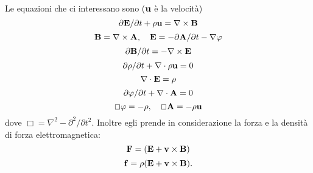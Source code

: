 Le equazioni che ci interessano sono ($\mathbf{u}$ \`e la velocit\`a)
\begin{equation}
  \partial \mathbf{E} / \partial t + \rho \mathbf{u} = \nabla \times \mathbf{B}
  \label{eq:corrente}
\end{equation}
\begin{equation}
  \mathbf{B} = \nabla \times \mathbf{A}, \quad \mathbf{E} = 
  - \partial \mathbf{A} / \partial t - \nabla \varphi
  \label{eq:aephi}
\end{equation}
\begin{equation}
  \partial \mathbf{B} / \partial t = - \nabla \times \mathbf{E}
  \label{eq:bede}
\end{equation}
\begin{equation}
  \partial \rho / \partial t + \nabla \cdot \rho \mathbf{u} = 0
  \label{eq:rhoeu}
\end{equation}
\begin{equation}
  \nabla \cdot \mathbf{E} = \rho
  \label{eq:rhoede}
\end{equation}
\begin{equation}
  \partial \varphi / \partial t + \nabla \cdot \mathbf{A} = 0
  \label{eq:phiea}
\end{equation}
\begin{equation}
  \Box \varphi = - \rho, \quad \Box \mathbf{A} = - \rho \mathbf{u}
  \label{eq:phiaerho}
\end{equation}
dove $\Box = \nabla^{2} - \partial^{2} / \partial t^{2}$. Inoltre egli
prende in considerazione la forza e la densit\`a di forza
elettromagnetica:
\begin{equation}
  \label{eq:forza}
  \mathbf{F} = (\mathbf{E} + \mathbf{v} \times \mathbf{B})
\end{equation}
\begin{equation}
  \label{eq:denforza}
  \mathbf{f} = \rho (\mathbf{E} + \mathbf{v} \times \mathbf{B}).
\end{equation}

